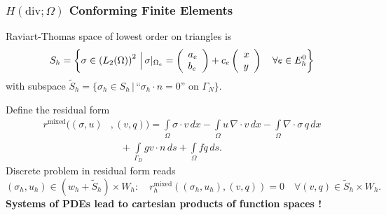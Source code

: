 \begin{frame}
\frametitle{$H(\text{div};\Omega)$ Conforming Finite Elements}
Raviart-Thomas space of lowest order on triangles is
\begin{align*}
S_h = \left\{\sigma\in\left(L_2(\Omega) \right)^2  \,\Bigl|\, \sigma|_{\Omega_e} =
\left(\begin{array}{l} a_e\\ b_e \end{array}\right) +
c_e \left(\begin{array}{l} x\\ y \end{array}\right) \quad\forall e\in E^0_h
\right\}
\end{align*}
with subspace $\tilde{S}_h = \{\sigma_h\in S_h \,|\, \text{``$\sigma_h\cdot n=0$'' on $\Gamma_N$} \}$.

Define the residual form
\begin{equation*}
\begin{split}
r^\text{mixed}((\sigma,u)&,(v,q)) =
\int\limits_\Omega \sigma\cdot v \, dx  -\int\limits_\Omega
u \, \nabla\cdot v \, dx
 - \int\limits_\Omega \nabla\cdot\sigma \, q \, dx\\
&\quad + \int\limits_{\Gamma_D} g v\cdot n \, ds + \int\limits_\Omega f q \,
ds .
\end{split}
\end{equation*}
Discrete problem in residual form reads
\begin{equation*}
(\sigma_h, u_h) \in (w_h+\tilde{S}_h)\times W_h : \quad
r_h^\text{mixed}\left((\sigma_h,u_h),(v,q)\right) = 0 \quad \forall
(v,q) \in \tilde{S}_h\times W_h .
\end{equation*}
\textbf{Systems of PDEs lead to cartesian products of function spaces !}
\end{frame}

